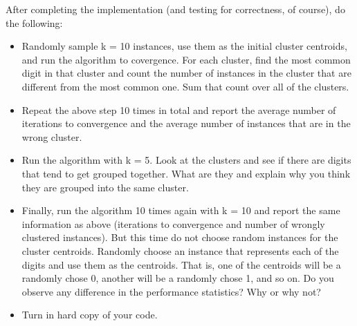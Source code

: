 \documentclass[paper=a4, fontsize=11pt]{scrartcl} %
\numberwithin{equation}{section} %
\numberwithin{figure}{section} %
\numberwithin{table}{section} %
\begin{document}
After completing the implementation (and testing for correctness, of course), do the following: 
\begin{itemize}

 \item  Randomly sample k = 10 instances, use them as the initial cluster centroids, and run the algorithm to covergence. For each cluster, find the most common digit in that cluster and count the number of instances in the cluster that are different from the most common one. Sum that count over all of the clusters.
 \item   Repeat the above step 10 times in total and report the average number of iterations to convergence and the average number of instances that are in the wrong cluster.
 \item   Run the algorithm with k = 5. Look at the clusters and see if there are digits that tend to get grouped together. What are they and explain why you think they are grouped into the same cluster.
  \item  Finally, run the algorithm 10 times again with k = 10 and report the same information as above (iterations to convergence and number of wrongly clustered instances). But this time do not choose random instances for the cluster centroids. Randomly choose an instance that represents each of the digits and use them as the centroids. That is, one of the centroids will be a randomly chose 0, another will be a randomly chose 1, and so on. Do you observe any difference in the performance statistics? Why or why not?
 \item   Turn in hard copy of your code. 

\end{itemize}
\end{document}
